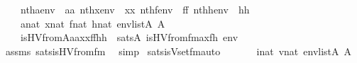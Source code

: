 \begin{isabellebody}
\ \ \ \ {\isachardoublequoteopen}nth{\isacharparenleft}{\kern0pt}a{\isacharcomma}{\kern0pt}env{\isacharparenright}{\kern0pt}\ {\isacharequal}{\kern0pt}\ aa{\isachardoublequoteclose}\ {\isachardoublequoteopen}nth{\isacharparenleft}{\kern0pt}x{\isacharcomma}{\kern0pt}env{\isacharparenright}{\kern0pt}\ {\isacharequal}{\kern0pt}\ xx{\isachardoublequoteclose}\ {\isachardoublequoteopen}nth{\isacharparenleft}{\kern0pt}f{\isacharcomma}{\kern0pt}env{\isacharparenright}{\kern0pt}\ {\isacharequal}{\kern0pt}\ ff{\isachardoublequoteclose}\ {\isachardoublequoteopen}nth{\isacharparenleft}{\kern0pt}h{\isacharcomma}{\kern0pt}env{\isacharparenright}{\kern0pt}\ {\isacharequal}{\kern0pt}\ hh{\isachardoublequoteclose}\isanewline
\ \ \ \ {\isachardoublequoteopen}a{\isasymin}nat{\isachardoublequoteclose}\ {\isachardoublequoteopen}x{\isasymin}nat{\isachardoublequoteclose}\ {\isachardoublequoteopen}f{\isasymin}nat{\isachardoublequoteclose}\ {\isachardoublequoteopen}h{\isasymin}nat{\isachardoublequoteclose}\ {\isachardoublequoteopen}env{\isasymin}list{\isacharparenleft}{\kern0pt}A{\isacharparenright}{\kern0pt}{\isachardoublequoteclose}\ {\isachardoublequoteopen}{}{\isasymin}A{\isachardoublequoteclose}\isanewline
\ \ \isanewline
\ \ \ \ {\isachardoublequoteopen}is{\isacharunderscore}{\kern0pt}HVfrom{\isacharparenleft}{\kern0pt}{\isacharhash}{\kern0pt}{\isacharhash}{\kern0pt}A{\isacharcomma}{\kern0pt}aa{\isacharcomma}{\kern0pt}xx{\isacharcomma}{\kern0pt}ff{\isacharcomma}{\kern0pt}hh{\isacharparenright}{\kern0pt}\ {\isasymlongleftrightarrow}\ sats{\isacharparenleft}{\kern0pt}A{\isacharcomma}{\kern0pt}\ is{\isacharunderscore}{\kern0pt}HVfrom{\isacharunderscore}{\kern0pt}fm{\isacharparenleft}{\kern0pt}a{\isacharcomma}{\kern0pt}x{\isacharcomma}{\kern0pt}f{\isacharcomma}{\kern0pt}h{\isacharparenright}{\kern0pt}{\isacharcomma}{\kern0pt}\ env{\isacharparenright}{\kern0pt}{\isachardoublequoteclose}\isanewline
%
\isadelimproof
\ \ %
\endisadelimproof
%
\isatagproof
{}\isamarkupfalse%
\ assms\ sats{\isacharunderscore}{\kern0pt}is{\isacharunderscore}{\kern0pt}HVfrom{\isacharunderscore}{\kern0pt}fm\ \isamarkupfalse%
\ simp%
\endisatagproof
{\isafoldproof}%
%
\isadelimproof
\isanewline
%
\endisadelimproof
\isanewline
\isanewline
{}\isamarkupfalse%
\ sats{\isacharunderscore}{\kern0pt}is{\isacharunderscore}{\kern0pt}Vset{\isacharunderscore}{\kern0pt}fm{\isacharunderscore}{\kern0pt}auto{\isacharcolon}{\kern0pt}\isanewline
\ \ \isanewline
\ \ \ \ {\isachardoublequoteopen}i{\isasymin}nat{\isachardoublequoteclose}\ {\isachardoublequoteopen}v{\isasymin}nat{\isachardoublequoteclose}\ {\isachardoublequoteopen}env{\isasymin}list{\isacharparenleft}{\kern0pt}A{\isacharparenright}{\kern0pt}{\isachardoublequoteclose}\ {\isachardoublequoteopen}{}{\isasymin}A{\isachardoublequoteclose}\isanewline

\end{isabellebody}
